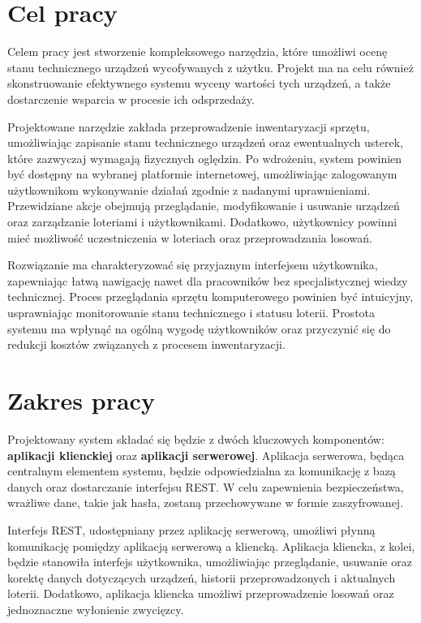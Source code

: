 \section{Cel pracy}
Celem  pracy jest stworzenie kompleksowego narzędzia, które umożliwi ocenę stanu technicznego urządzeń wycofywanych z użytku. Projekt ma na celu również skonstruowanie efektywnego systemu wyceny wartości tych urządzeń, a także dostarczenie wsparcia w procesie ich odsprzedaży.

Projektowane narzędzie zakłada przeprowadzenie inwentaryzacji sprzętu, umożliwiając zapisanie stanu technicznego urządzeń oraz ewentualnych usterek, które zazwyczaj wymagają fizycznych oględzin. Po wdrożeniu, system powinien być dostępny na wybranej platformie internetowej, umożliwiając zalogowanym użytkownikom wykonywanie działań zgodnie z nadanymi uprawnieniami. Przewidziane akcje obejmują przeglądanie, modyfikowanie i usuwanie urządzeń oraz zarządzanie loteriami i użytkownikami. Dodatkowo, użytkownicy powinni mieć możliwość uczestniczenia w loteriach oraz przeprowadzania losowań.

Rozwiązanie ma charakteryzować się przyjaznym interfejsem użytkownika, zapewniając łatwą nawigację nawet dla pracowników bez specjalistycznej wiedzy technicznej. Proces przeglądania sprzętu komputerowego powinien być intuicyjny, usprawniając monitorowanie stanu technicznego i statusu loterii. Prostota systemu ma wpłynąć na ogólną wygodę użytkowników oraz przyczynić się do redukcji kosztów związanych z procesem inwentaryzacji.

\section{Zakres pracy}
Projektowany system składać się będzie z dwóch kluczowych komponentów: \textbf{aplikacji klienckiej} oraz \textbf{aplikacji serwerowej}. Aplikacja serwerowa, będąca centralnym elementem systemu, będzie odpowiedzialna za komunikację z bazą danych oraz dostarczanie interfejsu REST. W celu zapewnienia bezpieczeństwa, wrażliwe dane, takie jak hasła, zostaną przechowywane w formie zaszyfrowanej.

Interfejs REST, udostępniany przez aplikację serwerową, umożliwi płynną komunikację pomiędzy aplikacją serwerową a kliencką. Aplikacja kliencka, z kolei, będzie stanowiła interfejs użytkownika, umożliwiając przeglądanie, usuwanie oraz korektę danych dotyczących urządzeń, historii przeprowadzonych i aktualnych loterii. Dodatkowo, aplikacja kliencka umożliwi przeprowadzenie losowań oraz jednoznaczne wyłonienie zwycięzcy.

